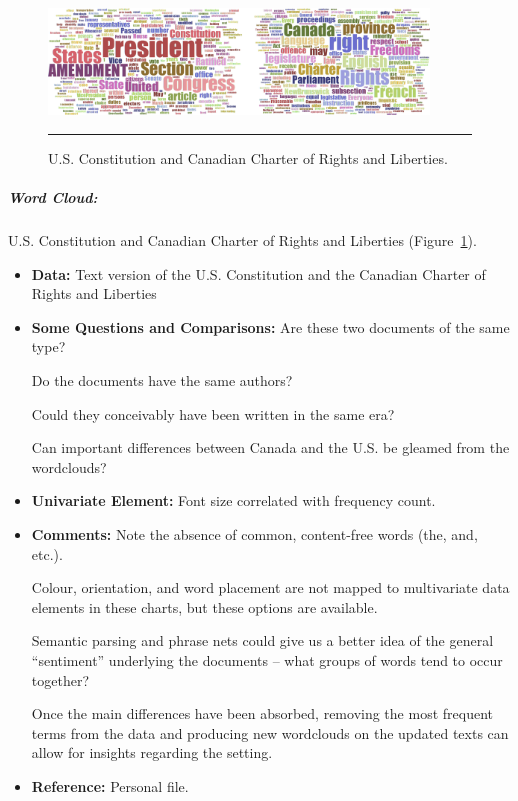 \newpage
\begin{figure}[H]
\centering
\includegraphics[width=0.9\textwidth]{images/DV/wordclouds.png}
\caption[\small Word Cloud: U.S. Constitution and Canadian Charter of Rights and Liberties ]{\small U.S. Constitution and Canadian Charter of Rights and Liberties.} \hrule\label{fig:ex_wc_UC}
\end{figure}
\afterpage{\FloatBarrier}
\subparagraph{Word Cloud:} U.S. Constitution and Canadian Charter of Rights and Liberties (Figure~\ref{fig:ex_wc_UC}).
\begin{itemize}[noitemsep]
\item \textbf{Data:} Text version of the U.S. Constitution and the Canadian Charter of Rights and Liberties 
\item \textbf{Some Questions and Comparisons:} Are these two documents of the same type? \par Do the documents have the same authors? \par Could they conceivably have been written in the same era? \par Can important differences between Canada and the U.S. be gleamed from the wordclouds? 
\item \textbf{Univariate Element:} Font size correlated with frequency count.    
\item \textbf{Comments:} Note the absence of common, content-free words (the, and, etc.). \par Colour, orientation, and word placement are not mapped to multivariate data elements in these charts, but these options are available. \par Semantic parsing and phrase nets could give us a better idea of the general ``sentiment'' underlying the documents -- what groups of words tend to occur together? \par Once the main differences have been absorbed, removing the most frequent terms from the data and producing new wordclouds on the updated texts can allow for insights regarding the setting.
\item \textbf{Reference:} Personal file.
\end{itemize}
